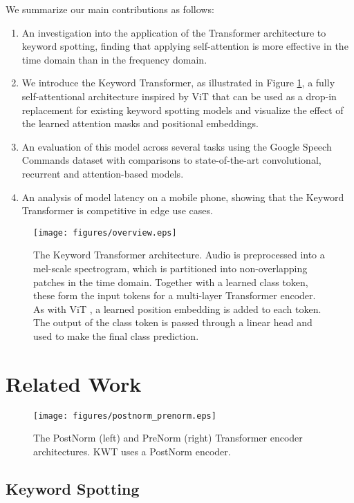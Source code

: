 \documentclass[a4paper]{article}
\begin{document}
We summarize our main contributions as follows:
\begin{enumerate}
\item An investigation into the application of the Transformer architecture to keyword spotting, finding that applying self-attention is more effective in the time domain than in the frequency domain.
\item We introduce the Keyword Transformer, as illustrated in Figure \ref{fig:overview}, a fully self-attentional architecture inspired by ViT \cite{dosovitskiy2020image} that can be used as a drop-in replacement for existing keyword spotting models and visualize the effect of the learned attention masks and positional embeddings.
\item An evaluation of this model across several tasks using the Google Speech Commands dataset with comparisons to state-of-the-art convolutional, recurrent and attention-based models.
\item An analysis of model latency on a mobile phone, showing that the Keyword Transformer is competitive in edge use cases.
\end{enumerate}

\begin{figure}[t]
  \centering
  \texttt{[image: figures/overview.eps]}
  \caption{The Keyword Transformer architecture. Audio is preprocessed into a mel-scale spectrogram, which is partitioned into non-overlapping patches in the time domain. Together with a learned class token, these form the input tokens for a multi-layer Transformer encoder. As with ViT \cite{dosovitskiy2020image}, a learned position embedding is added to each token. The output of the class token is passed through a linear head and used to make the final class prediction.}
  \label{fig:overview}
\end{figure}

\section{Related Work}

\begin{figure}[t]
  \centering
  \texttt{[image: figures/postnorm\_prenorm.eps]}
  \caption{The PostNorm (left) and PreNorm (right) Transformer encoder architectures. KWT uses a PostNorm encoder.}
  \label{fig:norm}
\end{figure}

\subsection{Keyword Spotting}
\end{document}
